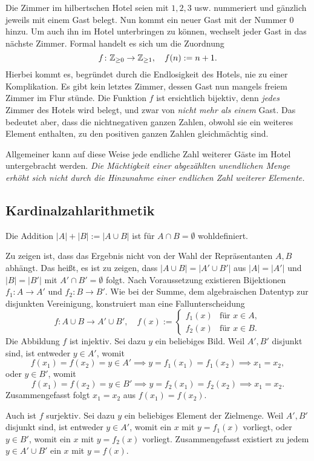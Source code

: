 Die Zimmer im hilbertschen Hotel seien mit $1, 2, 3$ usw. nummeriert
und gänzlich jeweils mit einem Gast belegt. Nun kommt ein neuer Gast
mit der Nummer $0$ hinzu. Um auch ihn im Hotel unterbringen zu können,
wechselt jeder Gast in das nächste Zimmer. Formal handelt es sich
um die Zuordnung
\[f\colon\mathbb Z_{\ge 0}\to\mathbb Z_{\ge 1},\quad f(n) := n + 1.\]
Hierbei kommt es, begründet durch die Endlosigkeit des Hotels, nie zu
einer Komplikation. Es gibt kein letztes Zimmer, dessen Gast nun mangels
freiem Zimmer im Flur stünde. Die Funktion $f$ ist ersichtlich bijektiv,
denn \emph{jedes} Zimmer des Hotels wird belegt, und zwar von
\emph{nicht mehr als einem} Gast. Das bedeutet aber, dass die
nichtnegativen ganzen Zahlen, obwohl sie ein weiteres Element enthalten,
zu den positiven ganzen Zahlen gleichmächtig sind.

Allgemeiner kann auf diese Weise jede endliche Zahl weiterer
Gäste im Hotel untergebracht werden. \emph{Die Mächtigkeit einer abgezählten
unendlichen Menge erhöht sich nicht durch die Hinzunahme einer
endlichen Zahl weiterer Elemente.}

\subsection{Kardinalzahlarithmetik}

\begin{Satz}
Die Addition $|A|+|B|:=|A\cup B|$ ist für $A\cap B=\emptyset$ wohldefiniert.
\end{Satz}
\begin{Beweis}
Zu zeigen ist, dass das Ergebnis nicht von der Wahl der Repräsentanten
$A,B$ abhängt. Das heißt, es ist zu zeigen, dass $|A\cup B|=|A'\cup B'|$
aus $|A|=|A'|$ und $|B|=|B'|$ mit $A'\cap B'=\emptyset$ folgt. Nach
Voraussetzung existieren Bijektionen $f_1\colon A\to A'$ und
$f_2\colon B\to B'$. Wie bei der Summe, dem algebraischen Datentyp
zur disjunkten Vereinigung, konstruiert man eine Fallunterscheidung
\[f\colon A\cup B\to A'\cup B',\quad f(x) :=
\begin{cases}
f_1(x) & \text{für $x\in A$},\\
f_2(x) & \text{für $x\in B$}.
\end{cases}\]
Die Abbildung $f$ ist injektiv. Sei dazu $y$ ein beliebiges Bild.
Weil $A',B'$ disjunkt sind, ist entweder $y\in A'$, womit
\[f(x_1)=f(x_2)=y\in A' \implies y=f_1(x_1)=f_1(x_2)\implies x_1=x_2,\]
oder $y\in B'$, womit
\[f(x_1)=f(x_2)=y\in B' \implies y=f_2(x_1)=f_2(x_2)\implies x_1=x_2. \]
Zusammengefasst folgt $x_1=x_2$ aus $f(x_1)=f(x_2)$.

Auch ist $f$ surjektiv. Sei dazu $y$ ein beliebiges Element der Zielmenge.
Weil $A',B'$ disjunkt sind, ist entweder $y\in A'$, womit ein $x$ mit
$y=f_1(x)$ vorliegt, oder $y\in B'$, womit ein $x$ mit $y=f_2(x)$
vorliegt. Zusammengefasst existiert zu jedem $y\in A'\cup B'$ ein $x$
mit $y=f(x)$.\,\qedsymbol
\end{Beweis}

